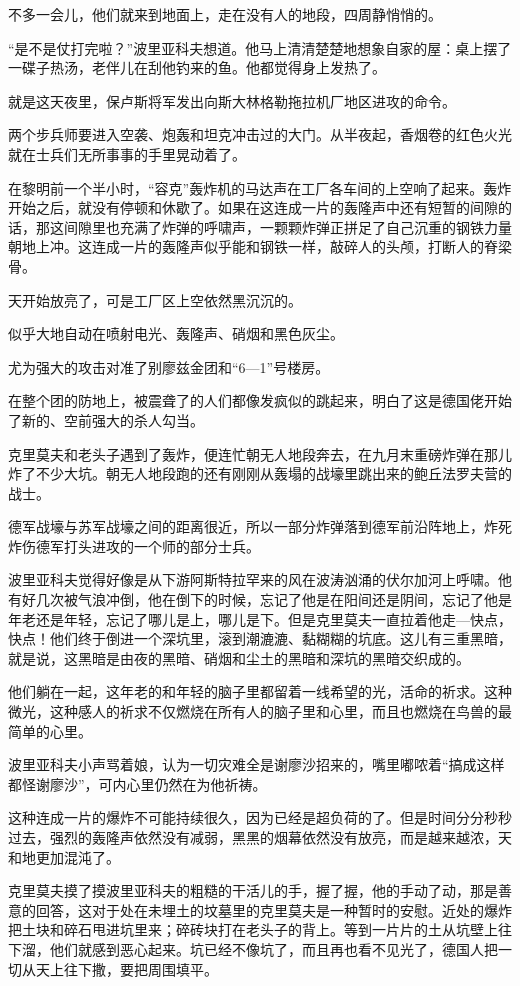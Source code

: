 不多一会儿，他们就来到地面上，走在没有人的地段，四周静悄悄的。

“是不是仗打完啦？”波里亚科夫想道。他马上清清楚楚地想象自家的屋：桌上摆了一碟子热汤，老伴儿在刮他钓来的鱼。他都觉得身上发热了。

就是这天夜里，保卢斯将军发出向斯大林格勒拖拉机厂地区进攻的命令。

两个步兵师要进入空袭、炮轰和坦克冲击过的大门。从半夜起，香烟卷的红色火光就在士兵们无所事事的手里晃动着了。

在黎明前一个半小时，“容克”轰炸机的马达声在工厂各车间的上空响了起来。轰炸开始之后，就没有停顿和休歇了。如果在这连成一片的轰隆声中还有短暂的间隙的话，那这间隙里也充满了炸弹的呼啸声，一颗颗炸弹正拼足了自己沉重的钢铁力量朝地上冲。这连成一片的轰隆声似乎能和钢铁一样，敲碎人的头颅，打断人的脊梁骨。

天开始放亮了，可是工厂区上空依然黑沉沉的。

似乎大地自动在喷射电光、轰隆声、硝烟和黑色灰尘。

尤为强大的攻击对准了别廖兹金团和“6—1”号楼房。

在整个团的防地上，被震聋了的人们都像发疯似的跳起来，明白了这是德国佬开始了新的、空前强大的杀人勾当。

克里莫夫和老头子遇到了轰炸，便连忙朝无人地段奔去，在九月末重磅炸弹在那儿炸了不少大坑。朝无人地段跑的还有刚刚从轰塌的战壕里跳出来的鲍丘法罗夫营的战士。

德军战壕与苏军战壕之间的距离很近，所以一部分炸弹落到德军前沿阵地上，炸死炸伤德军打头进攻的一个师的部分士兵。

波里亚科夫觉得好像是从下游阿斯特拉罕来的风在波涛汹涌的伏尔加河上呼啸。他有好几次被气浪冲倒，他在倒下的时候，忘记了他是在阳间还是阴间，忘记了他是年老还是年轻，忘记了哪儿是上，哪儿是下。但是克里莫夫一直拉着他走—快点，快点！他们终于倒进一个深坑里，滚到潮漉漉、黏糊糊的坑底。这儿有三重黑暗，就是说，这黑暗是由夜的黑暗、硝烟和尘土的黑暗和深坑的黑暗交织成的。

他们躺在一起，这年老的和年轻的脑子里都留着一线希望的光，活命的祈求。这种微光，这种感人的祈求不仅燃烧在所有人的脑子里和心里，而且也燃烧在鸟兽的最简单的心里。

波里亚科夫小声骂着娘，认为一切灾难全是谢廖沙招来的，嘴里嘟哝着“搞成这样都怪谢廖沙”，可内心里仍然在为他祈祷。

这种连成一片的爆炸不可能持续很久，因为已经是超负荷的了。但是时间分分秒秒过去，强烈的轰隆声依然没有减弱，黑黑的烟幕依然没有放亮，而是越来越浓，天和地更加混沌了。

克里莫夫摸了摸波里亚科夫的粗糙的干活儿的手，握了握，他的手动了动，那是善意的回答，这对于处在未埋土的坟墓里的克里莫夫是一种暂时的安慰。近处的爆炸把土块和碎石甩进坑里来；碎砖块打在老头子的背上。等到一片片的土从坑壁上往下溜，他们就感到恶心起来。坑已经不像坑了，而且再也看不见光了，德国人把一切从天上往下撒，要把周围填平。

